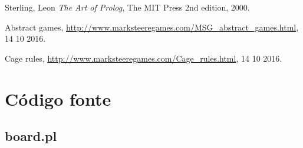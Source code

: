 \documentclass[a4paper]{article}
\begin{document}
\begin{thebibliography}{9}
  Sterling, Leon
  \emph{The Art of Prolog},
  The MIT Press
  2nd edition,
  2000.
  
  Abstract games,
  \url{http://www.marksteeregames.com/MSG_abstract_games.html}, 14 10 2016.
  
  Cage rules,
  \url{http://www.marksteeregames.com/Cage_rules.html}, 14 10 2016.
\end{thebibliography}

\newpage
\appendix
\section{Código fonte}
\subsection{board.pl}
\end{document}
